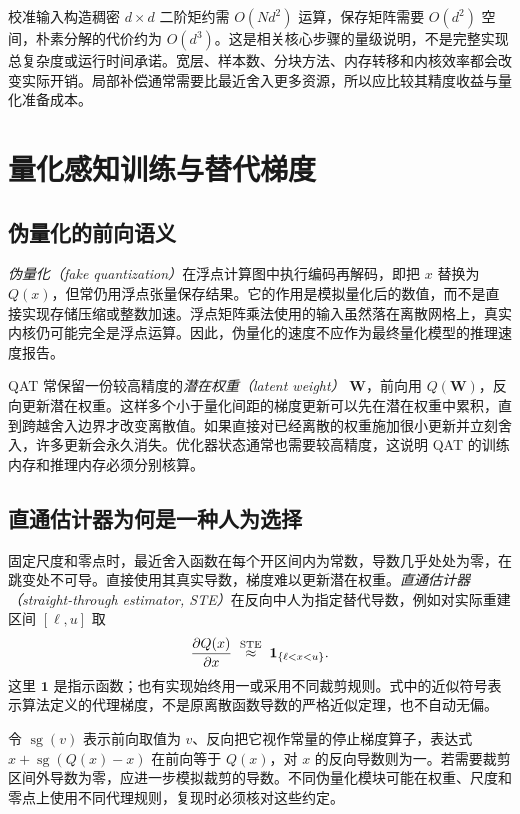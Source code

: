 \documentclass[UTF8,12pt,a4paper,fontset=fandol]{ctexart}
\begin{document}
校准输入构造稠密 $d\times d$ 二阶矩约需 $O(Nd^2)$ 运算，保存矩阵需要 $O(d^2)$ 空间，朴素分解的代价约为 $O(d^3)$。这是相关核心步骤的量级说明，不是完整实现总复杂度或运行时间承诺。宽层、样本数、分块方法、内存转移和内核效率都会改变实际开销。局部补偿通常需要比最近舍入更多资源，所以应比较其精度收益与量化准备成本。

\section{量化感知训练与替代梯度}
\label{sec:quant-qat}

\subsection{伪量化的前向语义}
\emph{伪量化（fake quantization）}在浮点计算图中执行编码再解码，即把 $x$ 替换为 $Q(x)$，但常仍用浮点张量保存结果。它的作用是模拟量化后的数值，而不是直接实现存储压缩或整数加速。浮点矩阵乘法使用的输入虽然落在离散网格上，真实内核仍可能完全是浮点运算。因此，伪量化的速度不应作为最终量化模型的推理速度报告。

QAT 常保留一份较高精度的\emph{潜在权重（latent weight）} $\mathbf W$，前向用 $Q(\mathbf W)$，反向更新潜在权重。这样多个小于量化间距的梯度更新可以先在潜在权重中累积，直到跨越舍入边界才改变离散值。如果直接对已经离散的权重施加很小更新并立刻舍入，许多更新会永久消失。优化器状态通常也需要较高精度，这说明 QAT 的训练内存和推理内存必须分别核算。

\subsection{直通估计器为何是一种人为选择}
固定尺度和零点时，最近舍入函数在每个开区间内为常数，导数几乎处处为零，在跳变处不可导。直接使用其真实导数，梯度难以更新潜在权重。\emph{直通估计器（straight-through estimator, STE）}在反向中人为指定替代导数，例如对实际重建区间 $[\ell,u]$ 取
\begin{equation}
 \frac{\partial Q(x)}{\partial x}\;\mathrel{\mathop{\approx}^{\rm STE}}\;
 \mathbf 1_{\{\ell<x<u\}}.
 \label{eq:quant-ste}
\end{equation}
这里 $\mathbf 1$ 是指示函数；也有实现始终用一或采用不同裁剪规则。式中的近似符号表示算法定义的代理梯度，不是原离散函数导数的严格近似定理，也不自动无偏。

令 $\operatorname{sg}(v)$ 表示前向取值为 $v$、反向把它视作常量的停止梯度算子，表达式 $x+\operatorname{sg}(Q(x)-x)$ 在前向等于 $Q(x)$，对 $x$ 的反向导数则为一。若需要裁剪区间外导数为零，应进一步模拟裁剪的导数。不同伪量化模块可能在权重、尺度和零点上使用不同代理规则，复现时必须核对这些约定。
\end{document}
